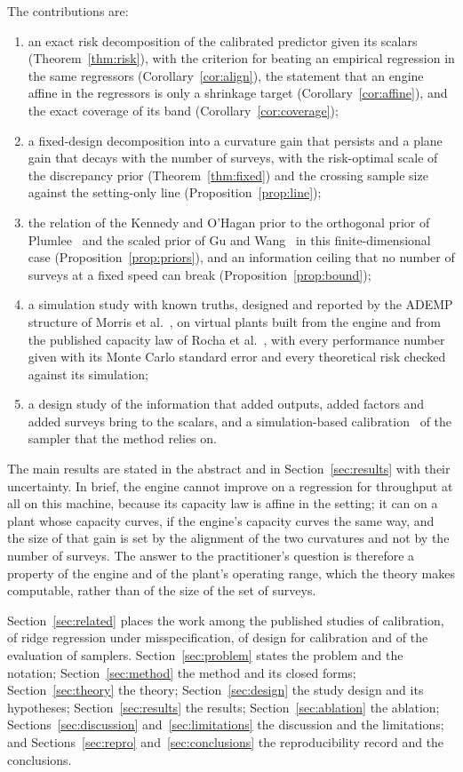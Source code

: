 The contributions are:
\begin{enumerate}
\item an exact risk decomposition of the calibrated predictor given its scalars (Theorem~\ref{thm:risk}), with the criterion
for beating an empirical regression in the same regressors (Corollary~\ref{cor:align}), the statement that an engine affine
in the regressors is only a shrinkage target (Corollary~\ref{cor:affine}), and the exact coverage of its band
(Corollary~\ref{cor:coverage});
\item a fixed-design decomposition into a curvature gain that persists and a plane gain that decays with the number of
surveys, with the risk-optimal scale of the discrepancy prior (Theorem~\ref{thm:fixed}) and the crossing sample size against
the setting-only line (Proposition~\ref{prop:line});
\item the relation of the Kennedy and O'Hagan prior to the orthogonal prior of Plumlee~\cite{plumlee} and the scaled prior of
Gu and Wang~\cite{guwang} in this finite-dimensional case (Proposition~\ref{prop:priors}), and an information ceiling that no
number of surveys at a fixed speed can break (Proposition~\ref{prop:bound});
\item a simulation study with known truths, designed and reported by the ADEMP structure of Morris et al.~\cite{morris}, on
virtual plants built from the engine and from the published capacity law of Rocha et al.~\cite{rocha}, with every
performance number given with its Monte Carlo standard error and every theoretical risk checked against its simulation;
\item a design study of the information that added outputs, added factors and added surveys bring to the scalars, and a
simulation-based calibration~\cite{talts,modrak} of the sampler that the method relies on.
\end{enumerate}

The main results are stated in the abstract and in Section~\ref{sec:results} with their uncertainty. In brief, the engine
cannot improve on a regression for throughput at all on this machine, because its capacity law is affine in the setting; it
can on a plant whose capacity curves, if the engine's capacity curves the same way, and the size of that gain is set by the
alignment of the two curvatures and not by the number of surveys. The answer to the practitioner's question is therefore a
property of the engine and of the plant's operating range, which the theory makes computable, rather than of the size of the
set of surveys.

Section~\ref{sec:related} places the work among the published studies of calibration, of ridge regression under
misspecification, of design for calibration and of the evaluation of samplers. Section~\ref{sec:problem} states the problem
and the notation; Section~\ref{sec:method} the method and its closed forms; Section~\ref{sec:theory} the theory;
Section~\ref{sec:design} the study design and its hypotheses; Section~\ref{sec:results} the results;
Section~\ref{sec:ablation} the ablation; Sections~\ref{sec:discussion} and~\ref{sec:limitations} the discussion and the
limitations; and Sections~\ref{sec:repro} and~\ref{sec:conclusions} the reproducibility record and the conclusions.
